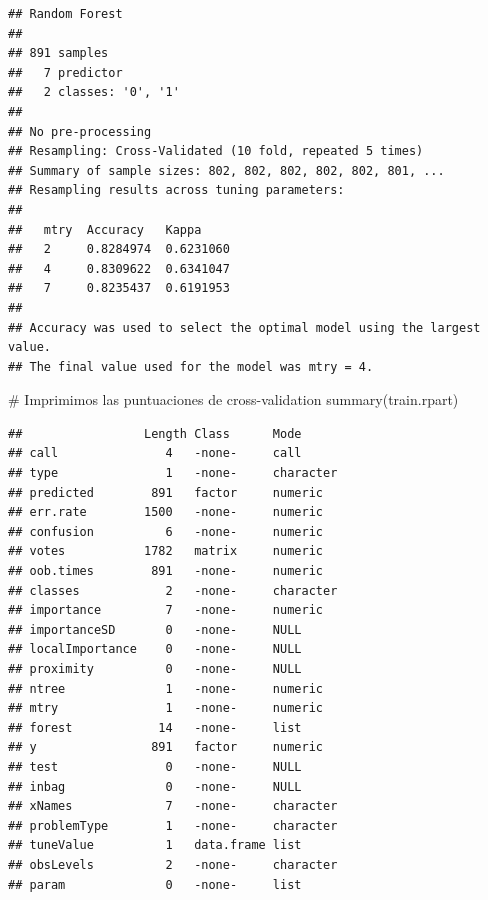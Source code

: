 \documentclass[
]{article}
\newenvironment{Shaded}{\begin{snugshade}}{\end{snugshade}}
\newcommand{\CommentTok}[1]{\textcolor[rgb]{0.50,0.62,0.50}{#1}}
\newcommand{\KeywordTok}[1]{\textcolor[rgb]{0.94,0.87,0.69}{#1}}
\newcommand{\NormalTok}[1]{\textcolor[rgb]{0.80,0.80,0.80}{#1}}
\newcommand{\OperatorTok}[1]{\textcolor[rgb]{0.94,0.94,0.82}{#1}}
\begin{document}
\begin{verbatim}
## Random Forest 
## 
## 891 samples
##   7 predictor
##   2 classes: '0', '1' 
## 
## No pre-processing
## Resampling: Cross-Validated (10 fold, repeated 5 times) 
## Summary of sample sizes: 802, 802, 802, 802, 802, 801, ... 
## Resampling results across tuning parameters:
## 
##   mtry  Accuracy   Kappa    
##   2     0.8284974  0.6231060
##   4     0.8309622  0.6341047
##   7     0.8235437  0.6191953
## 
## Accuracy was used to select the optimal model using the largest value.
## The final value used for the model was mtry = 4.
\end{verbatim}

\begin{Shaded}
\begin{Highlighting}[]
\CommentTok{# Imprimimos las puntuaciones de cross-validation}
\KeywordTok{summary}\NormalTok{(train.rpart)}
\end{Highlighting}
\end{Shaded}

\begin{verbatim}
##                 Length Class      Mode     
## call               4   -none-     call     
## type               1   -none-     character
## predicted        891   factor     numeric  
## err.rate        1500   -none-     numeric  
## confusion          6   -none-     numeric  
## votes           1782   matrix     numeric  
## oob.times        891   -none-     numeric  
## classes            2   -none-     character
## importance         7   -none-     numeric  
## importanceSD       0   -none-     NULL     
## localImportance    0   -none-     NULL     
## proximity          0   -none-     NULL     
## ntree              1   -none-     numeric  
## mtry               1   -none-     numeric  
## forest            14   -none-     list     
## y                891   factor     numeric  
## test               0   -none-     NULL     
## inbag              0   -none-     NULL     
## xNames             7   -none-     character
## problemType        1   -none-     character
## tuneValue          1   data.frame list     
## obsLevels          2   -none-     character
## param              0   -none-     list
\end{verbatim}

\begin{Shaded}
\end{Shaded}
\end{document}
